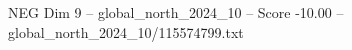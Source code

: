 \begin{textsample}{NEG Dim 9 – global\_north\_2024\_10 – Score -10.00 – global\_north\_2024\_10/115574799.txt}
\end{textsample}
